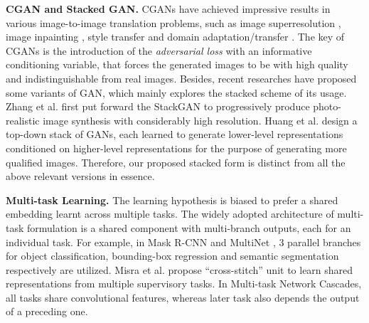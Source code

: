 \documentclass[10pt,twocolumn,letterpaper]{article}
\begin{document}
\noindent \textbf{CGAN and Stacked GAN.} CGANs have achieved impressive results in various image-to-image translation problems, such as image superresolution \cite{ledig2016photo}, image inpainting \cite{pathak2016context}, style transfer \cite{li2016precomputed} and domain adaptation/transfer \cite{isola2016image,zhu2017unpaired,liu2017unsupervised}. The key of CGANs is the introduction of the \emph{adversarial loss} with an informative conditioning variable, that forces the generated images to be with high quality and indistinguishable from real images. Besides, recent researches have proposed some variants of GAN, which mainly explores the stacked scheme of its usage. Zhang et al. \cite{zhang2016stackgan} first put forward the StackGAN to progressively produce photo-realistic image synthesis with considerably high resolution. Huang et al. \cite{huang2016stacked} design a top-down stack of GANs, each learned to generate lower-level representations conditioned on higher-level representations for the purpose of generating more qualified images. Therefore, our proposed stacked form is distinct from all the above relevant versions in essence.

\noindent \textbf{Multi-task Learning.} The learning hypothesis is biased to prefer a shared embedding learnt across multiple tasks. The widely adopted architecture of multi-task formulation is a shared component with multi-branch outputs, each for an individual task. For example, in Mask R-CNN \cite{he2017mask} and MultiNet \cite{teichmann2016multinet}, 3 parallel branches for object classification, bounding-box regression and semantic segmentation respectively are utilized. Misra et al. \cite{Misra_2016_CVPR} propose ``cross-stitch'' unit to learn shared representations from multiple supervisory tasks. In Multi-task Network Cascades\cite{Dai_2016_CVPR}, all tasks share convolutional features, whereas later task also depends the output of a preceding one. 
\end{document}
